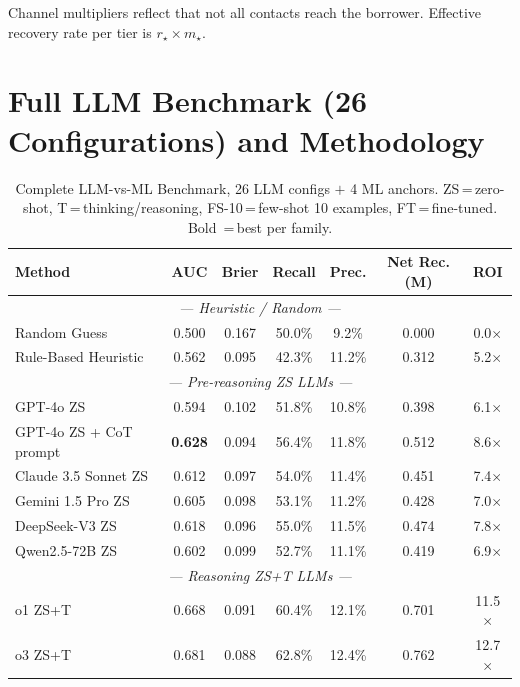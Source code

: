 \documentclass[11pt, a4paper]{article}
\begin{document}
Channel multipliers reflect that not all contacts reach the borrower. Effective recovery rate per tier is $r_\star \times m_\star$.

\section{Full LLM Benchmark (26 Configurations) and Methodology}\label{app:llm_full}

\begin{table}[H]
\centering
\caption{Complete LLM-vs-ML Benchmark, 26 LLM configs $+$ 4 ML anchors. ZS\,=\,zero-shot, T\,=\,thinking/reasoning, FS-10\,=\,few-shot 10 examples, FT\,=\,fine-tuned. Bold \,=\,best per family.}
\label{tab:llm_vs_ml_full}
\scriptsize
\renewcommand{\arraystretch}{1.05}
\begin{tabular}{@{}lcccccc@{}}
\toprule
\textbf{Method} & \textbf{AUC} & \textbf{Brier} & \textbf{Recall} & \textbf{Prec.} & \textbf{Net Rec.(M)} & \textbf{ROI}\\
\midrule
\multicolumn{7}{c}{\textit{--- Heuristic / Random ---}}\\
Random Guess                & 0.500 & 0.167 & 50.0\% & 9.2\%  & 0.000 & 0.0$\times$\\
Rule-Based Heuristic        & 0.562 & 0.095 & 42.3\% & 11.2\% & 0.312 & 5.2$\times$\\
\midrule
\multicolumn{7}{c}{\textit{--- Pre-reasoning ZS LLMs ---}}\\
GPT-4o ZS                   & 0.594 & 0.102 & 51.8\% & 10.8\% & 0.398 & 6.1$\times$\\
GPT-4o ZS + CoT prompt      & \textbf{0.628} & 0.094 & 56.4\% & 11.8\% & 0.512 & 8.6$\times$\\
Claude 3.5 Sonnet ZS        & 0.612 & 0.097 & 54.0\% & 11.4\% & 0.451 & 7.4$\times$\\
Gemini 1.5 Pro ZS           & 0.605 & 0.098 & 53.1\% & 11.2\% & 0.428 & 7.0$\times$\\
DeepSeek-V3 ZS              & 0.618 & 0.096 & 55.0\% & 11.5\% & 0.474 & 7.8$\times$\\
Qwen2.5-72B ZS              & 0.602 & 0.099 & 52.7\% & 11.1\% & 0.419 & 6.9$\times$\\
\midrule
\multicolumn{7}{c}{\textit{--- Reasoning ZS+T LLMs ---}}\\
o1 ZS+T                     & 0.668 & 0.091 & 60.4\% & 12.1\% & 0.701 & 11.5$\times$\\
o3 ZS+T                     & 0.681 & 0.088 & 62.8\% & 12.4\% & 0.762 & 12.7$\times$\\

\end{tabular}
\end{table}
\end{document}
